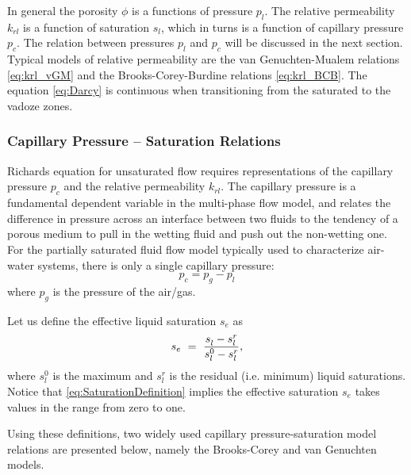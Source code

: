 In general the porosity $\phi$ is a functions of pressure $p_l$.
The relative permeability $k_{rl}$ is a function of saturation $s_l$,
which in turns is a function of capillary pressure $p_c$. 
The relation between pressures $p_l$ and $p_c$ will be discussed in the next section.
Typical models of relative permeability are 
the van Genuchten-Mualem relations \eqref{eq:krl_vGM} and 
the Brooks-Corey-Burdine relations \eqref{eq:krl_BCB}.
The equation \eqref{eq:Darcy} is continuous when transitioning from the saturated to the vadoze zones.


\subsubsection{Capillary Pressure -- Saturation Relations}  
\label{sec:richards-pc_s_relations}

Richards equation for unsaturated flow
requires representations of the capillary pressure $p_c$ and the relative permeability $k_{rl}$.  
The capillary pressure is a fundamental dependent variable in the multi-phase flow model, and
relates the difference in pressure across an interface between two
fluids to the tendency of a porous medium to pull in the wetting fluid
and push out the non-wetting one.
For the partially saturated fluid flow model typically used to
characterize air-water systems, 
there is only a single capillary pressure:
\begin{equation} \label{eq:GasLiquidCapillaryPressure}
  p_c = p_g - p_l
\end{equation}
where $p_g$ is the pressure of the air/gas. 

Let us define the effective liquid saturation $s_e$ as
\begin{equation}
\label{eq:SaturationDefinition}
s_e \ =\  \frac{s_l^{} - s_l^r}{s_l^0 - s_l^r}, 
\end{equation}
where $s_l^0$ is the maximum and
$s_l^r$ is the residual (i.e. minimum) liquid saturations. 
Notice that \eqref{eq:SaturationDefinition} implies the effective saturation $s_e$
takes values in the range from zero to one.

Using these definitions, 
two widely used capillary pressure-saturation model relations are presented below, 
namely the Brooks-Corey \citep{brooks1964hydraulic} and van Genuchten \citep{van1980closed} 
models.


